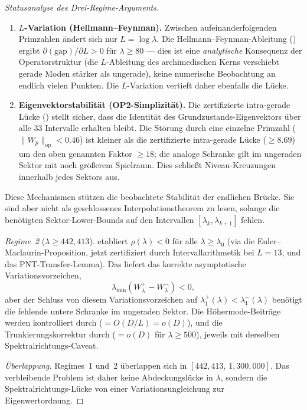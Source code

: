 ﻿\documentclass[12pt,a4paper]{article}
\theoremstyle{definition}
\theoremstyle{remark}
\begin{document}
\begin{proof}[Statusanalyse des Drei-Regime-Arguments]
\begin{enumerate}[label=(\roman*)]
  \item \textbf{$L$-Variation (Hellmann--Feynman).}
    Zwischen aufeinanderfolgenden Primzahlen ändert sich nur $L = \log\lambda$.
    Die Hellmann--Feynman-Ableitung () ergibt $\partial(\mathrm{gap})/\partial L > 0$ für $\lambda \geq 80$ --- dies ist eine \emph{analytische} Konsequenz der Operatorstruktur (die $L$-Ableitung des archimedischen Kerns verschiebt gerade Moden stärker als ungerade), keine numerische Beobachtung an endlich vielen Punkten.
    Die $L$-Variation vertieft daher ebenfalls die Lücke.

  \item \textbf{Eigenvektorstabilität (OP2-Simplizität).}
    Die zertifizierte intra-gerade Lücke () stellt sicher, dass die Identität des Grundzustands-Eigenvektors über alle $33$ Intervalle erhalten bleibt.
    Die Störung durch eine einzelne Primzahl ($\|W_p\|_{\mathrm{op}} < 0.46$) ist kleiner als die zertifizierte intra-gerade Lücke ($\geq 8.69$) um den oben genannten Faktor $\geq 18$; die analoge Schranke gilt im ungeraden Sektor mit noch größerem Spielraum.
    Dies schließt Niveau-Kreuzungen innerhalb jedes Sektors aus.
\end{enumerate}

\noindent Diese Mechanismen stützen die beobachtete Stabilität der endlichen Brücke. Sie sind aber nicht als geschlossenes Interpolationstheorem zu lesen, solange die benötigten Sektor-Lower-Bounds auf den Intervallen $[\lambda_k,\lambda_{k+1}]$ fehlen.

\emph{Regime~2} ($\lambda \geq 442{,}413$).  etabliert $\rho(\lambda) < 0$ für alle $\lambda \geq \lambda_0$ (via die Euler--Maclaurin-Proposition, jetzt zertifiziert durch Intervallarithmetik bei $L = 13$, und das PNT-Transfer-Lemma). Das liefert das korrekte asymptotische Variationsvorzeichen,
\[
  \lambda_{\min}(W^+_\lambda-W^-_\lambda)<0,
\]
aber der Schluss von diesem Variationsvorzeichen auf
$\lambda_1^+(\lambda)<\lambda_1^-(\lambda)$ benötigt die fehlende untere Schranke im ungeraden Sektor. Die Höhermode-Beiträge werden kontrolliert durch  ($= O(D/L) = o(D)$), und die Trunkierungskorrektur durch  ($= o(D)$ für $\lambda \geq 500$), jeweils mit derselben Spektralrichtungs-Caveat.

\emph{Überlappung.} Regimes~1 und~2 überlappen sich in $[442{,}413,\, 1{,}300{,}000]$. Das verbleibende Problem ist daher keine Abdeckungslücke in $\lambda$, sondern die Spektralrichtungs-Lücke von einer Variationsungleichung zur Eigenwertordnung.
\end{proof}
\end{document}
